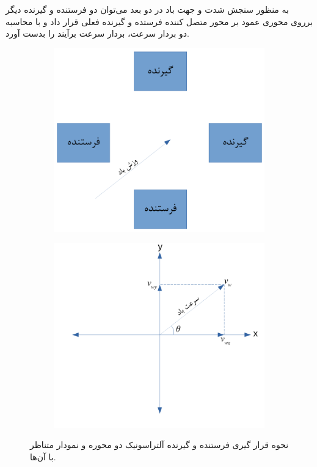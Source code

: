به منظور سنجش شدت و جهت باد در دو بعد می‌توان دو فرستنده و گیرنده دیگر برروی محوری عمود بر محور متصل کننده فرستده و گیرنده فعلی قرار داد و با محاسبه دو بردار سرعت، بردار سرعت برآیند را بدست آورد.

\begin{figure}[!h]
	\begin{subfigure}[b]{0.5\textwidth}
		\includegraphics[width=\linewidth]{Assets/ultrasonic 2d.pdf}
		\caption{}
		\label{fig:2dUltrasonic}
	\end{subfigure}
	\begin{subfigure}[b]{0.5\textwidth}
		\includegraphics[width=\linewidth]{Assets/ultrasonic 2d axis.pdf}
		\caption{}
		\label{fig:2dUltrasonicAxis}
	\end{subfigure}
	\caption{نحوه قرار گیری فرستنده و گیرنده آلتراسونیک دو محوره و نمودار متناظر با آن‌ها.}
\end{figure}


